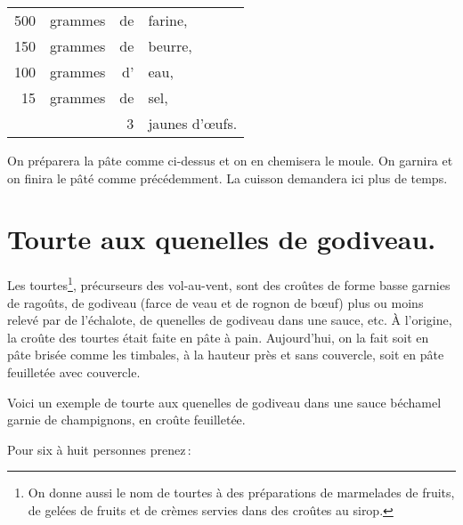\medskip

\footnotesize
\begin{longtable}{rrrp{16em}}
    500 & grammes & de & farine,                                                                          \\
    150 & grammes & de & beurre,                                                                          \\
    100 & grammes & d' & eau,                                                                             \\
     15 & grammes & de & sel,                                                                             \\
        &         &  3 & jaunes d'œufs.                                                                   \\
\end{longtable}
\normalsize

On préparera la pâte comme ci-dessus et on en chemisera le moule. On garnira et
on finira le pâté comme précédemment. La cuisson demandera ici plus de temps.

\section*{\centering Tourte aux quenelles de godiveau.}
{}

Les tourtes\footnote{
On donne aussi le nom de tourtes à des préparations de
marmelades de fruits, de gelées de fruits et de crèmes servies dans des croûtes
au sirop.}, précurseurs des vol-au-vent, sont des croûtes de forme basse
garnies de ragoûts, de godiveau (farce de veau et de rognon de bœuf) plus ou
moins relevé par de l'échalote, de quenelles de godiveau dans une sauce, etc.
À l'origine, la croûte des tourtes était faite en pâte à pain. Aujourd'hui, on
la fait soit en pâte brisée comme les timbales, à la hauteur près et sans
couvercle, soit en pâte feuilletée avec couvercle.

Voici un exemple de tourte aux quenelles de godiveau dans une sauce béchamel
garnie de champignons, en croûte feuilletée.

\medskip

Pour six à huit personnes prenez :

\medskip

